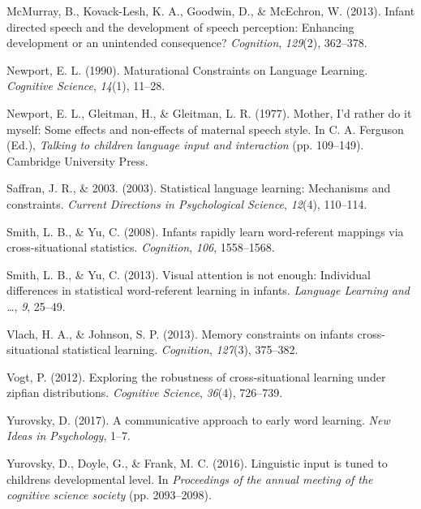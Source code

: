 \documentclass[10pt, letterpaper]{article}
\begin{document}
\hypertarget{ref-mcmurray2013}{}
McMurray, B., Kovack-Lesh, K. A., Goodwin, D., \& McEchron, W. (2013).
Infant directed speech and the development of speech perception:
Enhancing development or an unintended consequence? \emph{Cognition},
\emph{129}(2), 362--378.

\hypertarget{ref-newport1990}{}
Newport, E. L. (1990). Maturational Constraints on Language Learning.
\emph{Cognitive Science}, \emph{14}(1), 11--28.

\hypertarget{ref-newport1977}{}
Newport, E. L., Gleitman, H., \& Gleitman, L. R. (1977). Mother, I'd
rather do it myself: Some effects and non-effects of maternal speech
style. In C. A. Ferguson (Ed.), \emph{Talking to children language input
and interaction} (pp. 109--149). Cambridge University Press.

\hypertarget{ref-saffran2003}{}
Saffran, J. R., \& 2003. (2003). Statistical language learning:
Mechanisms and constraints. \emph{Current Directions in Psychological
Science}, \emph{12}(4), 110--114.

\hypertarget{ref-smith2008}{}
Smith, L. B., \& Yu, C. (2008). Infants rapidly learn word-referent
mappings via cross-situational statistics. \emph{Cognition}, \emph{106},
1558--1568.

\hypertarget{ref-smith2013}{}
Smith, L. B., \& Yu, C. (2013). Visual attention is not enough:
Individual differences in statistical word-referent learning in infants.
\emph{Language Learning and \ldots{}}, \emph{9}, 25--49.

\hypertarget{ref-vlach2013}{}
Vlach, H. A., \& Johnson, S. P. (2013). Memory constraints on infants
cross-situational statistical learning. \emph{Cognition}, \emph{127}(3),
375--382.

\hypertarget{ref-vogt2012}{}
Vogt, P. (2012). Exploring the robustness of cross-situational learning
under zipfian distributions. \emph{Cognitive Science}, \emph{36}(4),
726--739.

\hypertarget{ref-yurovsky2017}{}
Yurovsky, D. (2017). A communicative approach to early word learning.
\emph{New Ideas in Psychology}, 1--7.

\hypertarget{ref-yurovsky2016}{}
Yurovsky, D., Doyle, G., \& Frank, M. C. (2016). Linguistic input is
tuned to childrens developmental level. In \emph{Proceedings of the
annual meeting of the cognitive science society} (pp. 2093--2098).


\end{document}
